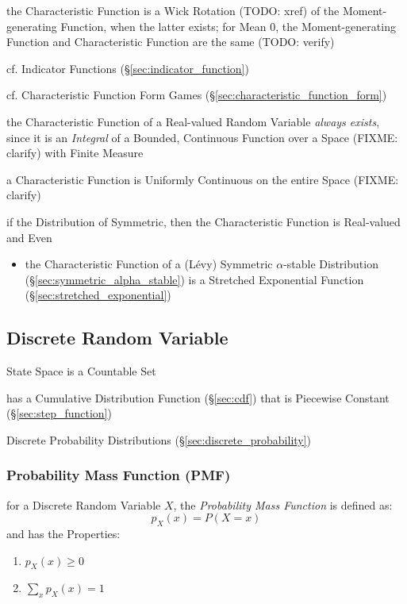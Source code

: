 the Characteristic Function is a Wick Rotation (TODO: xref) of the
Moment-generating Function, when the latter exists; for Mean $0$, the
Moment-generating Function and Characteristic Function are the same (TODO:
verify)

\fist cf. Indicator Functions (\S\ref{sec:indicator_function})

cf. Characteristic Function Form Games
(\S\ref{sec:characteristic_function_form})

the Characteristic Function of a Real-valued Random Variable \emph{always
exists}, since it is an \emph{Integral} of a Bounded, Continuous Function over a
Space (FIXME: clarify) with Finite Measure

a Characteristic Function is Uniformly Continuous on the entire Space (FIXME:
clarify)

if the Distribution of Symmetric, then the Characteristic Function is
Real-valued and Even

\begin{itemize}
  \item the Characteristic Function of a (L\'evy) Symmetric $\alpha$-stable
    Distribution (\S\ref{sec:symmetric_alpha_stable}) is a Stretched Exponential
    Function (\S\ref{sec:stretched_exponential})
\end{itemize}



\subsection{Discrete Random Variable}\label{sec:discrete_random_variable}

State Space is a Countable Set

has a Cumulative Distribution Function (\S\ref{sec:cdf}) that is Piecewise
Constant (\S\ref{sec:step_function})

\fist Discrete Probability Distributions (\S\ref{sec:discrete_probability})



\subsubsection{Probability Mass Function (PMF)}\label{sec:pmf}

for a Discrete Random Variable $X$, the \emph{Probability Mass Function} is
defined as:
\[
  p_X(x) = P(X = x)
\]
and has the Properties:
\begin{enumerate}
  \item $p_X(x) \geq 0$
  \item $\sum_x p_X(x) = 1$
\end{enumerate}

